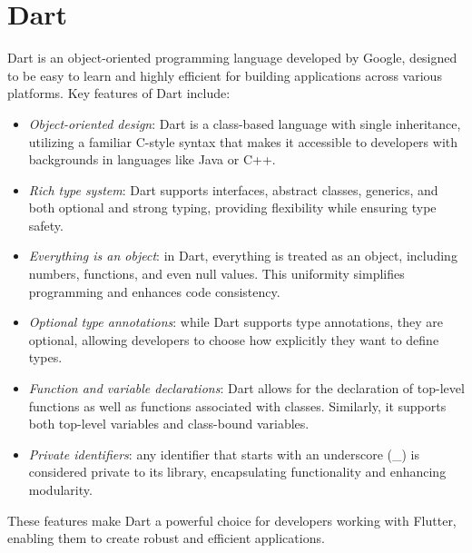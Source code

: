 \section{Dart}

Dart is an object-oriented programming language developed by Google, designed to be easy to learn and highly efficient for building applications across various platforms. 
Key features of Dart include:
\begin{itemize}
    \item \textit{Object-oriented design}: Dart is a class-based language with single inheritance, utilizing a familiar C-style syntax that makes it accessible to developers with backgrounds in languages like Java or C++.
    \item \textit{Rich type system}: Dart supports interfaces, abstract classes, generics, and both optional and strong typing, providing flexibility while ensuring type safety.
    \item \textit{Everything is an object}: in Dart, everything is treated as an object, including numbers, functions, and even null values.
        This uniformity simplifies programming and enhances code consistency.
    \item \textit{Optional type annotations}: while Dart supports type annotations, they are optional, allowing developers to choose how explicitly they want to define types.
    \item \textit{Function and variable declarations}: Dart allows for the declaration of top-level functions as well as functions associated with classes. 
        Similarly, it supports both top-level variables and class-bound variables.
    \item \textit{Private identifiers}: any identifier that starts with an underscore (\_) is considered private to its library, encapsulating functionality and enhancing modularity.
\end{itemize}
These features make Dart a powerful choice for developers working with Flutter, enabling them to create robust and efficient applications.